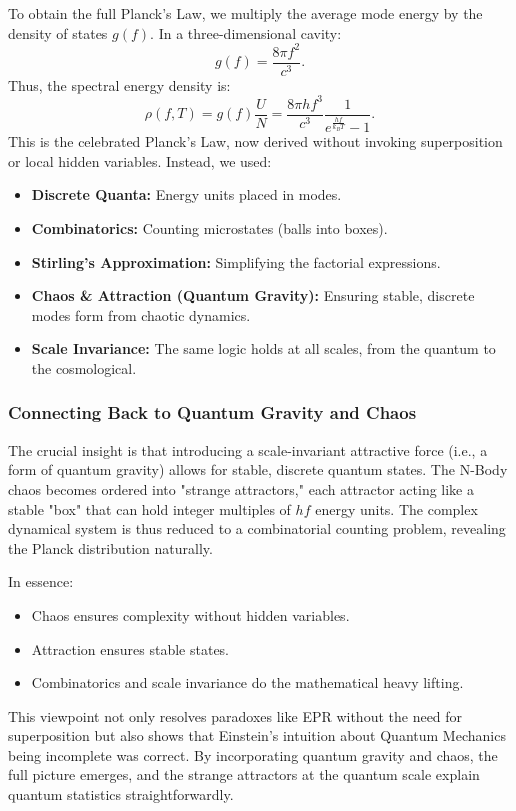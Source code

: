 \documentclass{report}
\begin{document}
To obtain the full Planck’s Law, we multiply the average mode energy by the density of states $g(f)$. In a three-dimensional cavity:
\[
g(f) = \frac{8\pi f^2}{c^3}.
\]
\newline
Thus, the spectral energy density is:
\[
\rho(f,T) = g(f)\frac{U}{N} = \frac{8\pi h f^3}{c^3} \frac{1}{e^{\frac{hf}{k_B T}} - 1}.
\]
\newline
This is the celebrated Planck’s Law, now derived without invoking superposition or local hidden variables. Instead, we used:
\begin{itemize}[nosep]
    \item \textbf{Discrete Quanta:} Energy units placed in modes.
    \item \textbf{Combinatorics:} Counting microstates (balls into boxes).
    \item \textbf{Stirling’s Approximation:} Simplifying the factorial expressions.
    \item \textbf{Chaos \& Attraction (Quantum Gravity):} Ensuring stable, discrete modes form from chaotic dynamics.
    \item \textbf{Scale Invariance:} The same logic holds at all scales, from the quantum to the cosmological.
\end{itemize}
\subsubsection*{Connecting Back to Quantum Gravity and Chaos}

The crucial insight is that introducing a scale-invariant attractive force (i.e., a form of quantum gravity) allows for stable, discrete quantum states. The N-Body chaos becomes ordered into "strange attractors," each attractor acting like a stable "box" that can hold integer multiples of $hf$ energy units. The complex dynamical system is thus reduced to a combinatorial counting problem, revealing the Planck distribution naturally.

In essence:
\begin{itemize}[nosep]
    \item Chaos ensures complexity without hidden variables.
    \item Attraction ensures stable states.
    \item Combinatorics and scale invariance do the mathematical heavy lifting.
\end{itemize}

This viewpoint not only resolves paradoxes like EPR without the need for superposition but also shows that Einstein’s intuition about Quantum Mechanics being incomplete was correct. By incorporating quantum gravity and chaos, the full picture emerges, and the strange attractors at the quantum scale explain quantum statistics straightforwardly.
\end{document}
